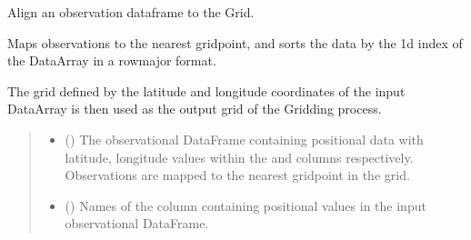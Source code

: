 \documentclass[letterpaper,10pt,english]{sphinxmanual}
\begin{document}
\begin{fulllineitems}

\begin{fulllineitems}
\label{\detokenize{grid:glomar_gridding.grid.Grid.map_observations}}
\pysigstartsignatures
\pysiglinewithargsret
{}
{\sphinxparamcomma {}\sphinxparamcomma {}\sphinxparamcomma {}\sphinxparamcomma {}\sphinxparamcomma {}\sphinxparamcomma {}\sphinxparamcomma {}}
{}
\pysigstopsignatures
\sphinxAtStartPar
Align an observation dataframe to the Grid.

\sphinxAtStartPar
Maps observations to the nearest grid\sphinxhyphen{}point, and sorts the data by the
1d index of the DataArray in a row\sphinxhyphen{}major format.

\sphinxAtStartPar
The grid defined by the latitude and longitude coordinates of the input
DataArray is then used as the output grid of the Gridding process.
\begin{quote}\begin{description}
\begin{itemize}
\item {}
\sphinxAtStartPar
{} () \textendash{} The observational DataFrame containing positional data with
latitude, longitude values within the  and
 columns respectively. Observations are mapped to the
nearest grid\sphinxhyphen{}point in the grid.

\item {}
\sphinxAtStartPar
{} (\sphinxstyleliteralemphasis{\sphinxupquote{{[}}}\sphinxstyleliteralemphasis{\sphinxupquote{{]}}}) \textendash{} Names of the column containing positional values in the input
observational DataFrame.


\end{itemize}
\end{description}
\end{quote}
\end{fulllineitems}
\end{fulllineitems}
\end{document}
